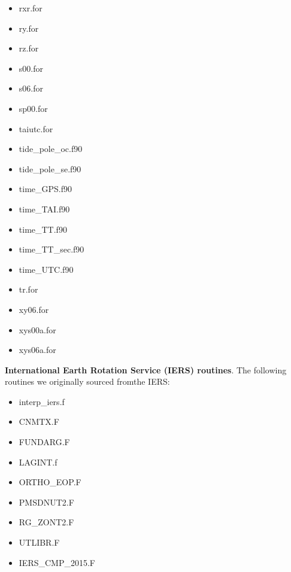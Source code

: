 \begin{itemize}
    \item rxr.for
    \item ry.for
    \item rz.for
    \item s00.for
    \item s06.for
    \item sp00.for
    \item taiutc.for
    \item tide\_pole\_oc.f90
    \item tide\_pole\_se.f90
    \item time\_GPS.f90
    \item time\_TAI.f90
    \item time\_TT.f90
    \item time\_TT\_sec.f90
    \item time\_UTC.f90
    \item tr.for
    \item xy06.for
    \item xys00a.for
    \item xys06a.for
\end{itemize}


\noindent\textbf{International Earth Rotation Service (IERS) routines}. The following routines we originally sourced fromthe IERS:
\begin{itemize}
    \item interp\_iers.f
    \item CNMTX.F
    \item FUNDARG.F
    \item LAGINT.f
    \item ORTHO\_EOP.F
    \item PMSDNUT2.F
    \item RG\_ZONT2.F
    \item UTLIBR.F
    \item IERS\_CMP\_2015.F
\end{itemize}

